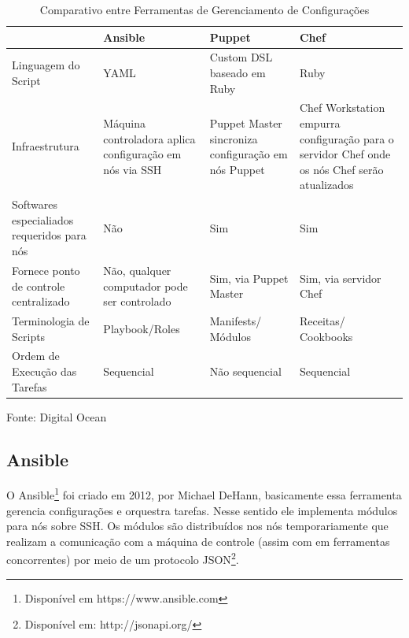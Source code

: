 \begin{table}[h]
	\centering

	\begin{tabular}{|p{3.0cm}|p{3.0cm}|p{3.0cm}|p{3.0cm}|}
		\cline{1-4}
		
		  & Ansible &Puppet & Chef \\ %
		\hline                               %
		Linguagem do Script & YAML        & Custom DSL baseado em Ruby & Ruby\\ \cline{1-4}
		
		Infraestrutura & Máquina controladora aplica configuração em nós via SSH  & Puppet Master sincroniza configuração em nós Puppet & Chef Workstation empurra configuração para o servidor Chef onde os nós Chef serão atualizados  \\ \cline{1-4}
		
		Softwares especialiados requeridos para nós & Não & Sim & Sim\\ \cline{1-4}
		
		Fornece ponto de controle centralizado & Não, qualquer computador pode ser controlado &  Sim, via  Puppet Master & Sim, via servidor Chef \\ \cline{1-4}
		
		Terminologia de Scripts & Playbook/Roles & Manifests/ Módulos & Receitas/ Cookbooks \\ \cline{1-4}
		
		Ordem de Execução das Tarefas & Sequencial & Não sequencial & Sequencial \\ \cline{1-4}         
		
	\end{tabular}
	\caption{Comparativo entre Ferramentas de Gerenciamento de Configurações}
	Fonte: Digital Ocean\footnotemark
\end{table}


\subsection{Ansible}

O Ansible\footnote{Disponível em https://www.ansible.com} foi criado em 2012, por Michael DeHann, basicamente essa ferramenta gerencia configurações e orquestra tarefas. Nesse sentido ele implementa módulos para nós sobre SSH. Os módulos são distribuídos nos nós temporariamente que realizam a comunicação com a máquina de controle (assim com em ferramentas concorrentes) por meio de um protocolo JSON\footnote{Disponível em: http://jsonapi.org/}.

